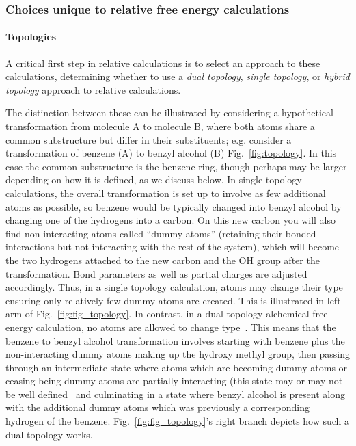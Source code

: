 \documentclass[9pt,bestpractices]{livecoms}
\begin{document}
\subsubsection{Choices unique to relative free energy calculations}
\label{sec:relative-fe-protocol}
%
\paragraph{Topologies} 
A critical first step in relative calculations is to select an approach to these calculations, determining whether to use a \emph{dual topology}, \emph{single topology}, or \emph{hybrid topology} approach to relative calculations.

The distinction between these can be illustrated by considering a hypothetical transformation from molecule A to molecule B, where both atoms share a common substructure but differ in their substituents; e.g. consider a transformation of benzene (A) to benzyl alcohol (B) Fig.~\ref{fig:topology}.
In this case the common substructure is the benzene ring, though perhaps may be larger depending on how it is defined, as we discuss below.
In single topology calculations, the overall transformation is set up to involve as few additional atoms as possible, so benzene would be typically changed into benzyl alcohol by changing one of the hydrogens into a carbon. On this new carbon you will also find non-interacting atoms called ``dummy atoms'' (retaining their bonded interactions but not interacting with the rest of the system), which will become the two hydrogens attached to the new carbon and the OH group after the transformation. Bond parameters as well as partial charges are adjusted accordingly. 
Thus, in a single topology calculation, atoms may change their type ensuring only relatively few dummy atoms are created. This is illustrated in left arm of Fig.~\ref{fig:fig_topology}. 
In contrast, in a dual topology alchemical free energy calculation, no atoms are allowed to change type~\cite{shirts2012best}. This means that the benzene to benzyl alcohol transformation involves starting with benzene plus the non-interacting dummy atoms making up the hydroxy methyl group, then passing through an intermediate state where atoms which are becoming dummy atoms or ceasing being dummy atoms are partially interacting (this state may or may not be well defined~\cite{mobley2014blind}  and culminating in a state where benzyl alcohol is present along with the additional dummy atoms which was previously a corresponding hydrogen of the benzene. Fig.~\ref{fig:fig_topology}'s right branch depicts how such a dual topology works. 
\end{document}
